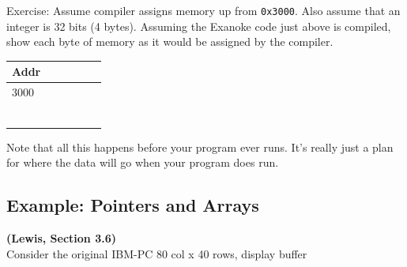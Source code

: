 Exercise: Assume compiler assigns memory up from {\tt 0x3000}.
Also assume that an integer is 32 bits (4 bytes). Assuming the Exanoke code just above
is compiled, show each byte of memory as it would be assigned
by the compiler.

\begin{tabular}{|l|c|c|c|c|c|}
\hline
Addr & & & & \\ \hline
3000 & & & & \\ \hline
 & & & & \\ \hline
 & & & & \\ \hline
 & & & & \\ \hline
 & & & & \\ \hline
 & & & & \\ \hline
 & & & & \\ \hline
\end{tabular}

Note that all this happens before your program ever runs.  It's really just a plan 
for where the data will go when your program does run. 



%
%
%
%
%
\subsection{Example: Pointers and Arrays}
{\bf (Lewis, Section 3.6)}\\
Consider the original IBM-PC
80 col x 40 rows, display buffer \\

